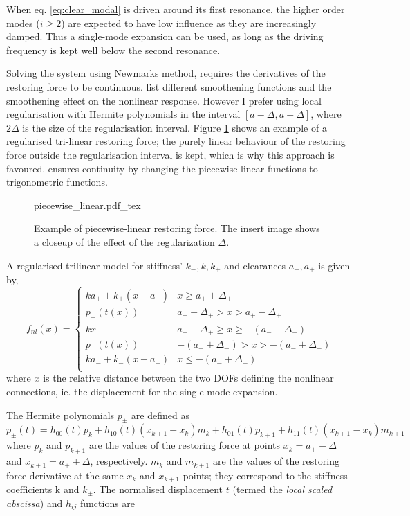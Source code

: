 When eq. \eqref{eq:clear_modal} is driven around its first resonance, the higher
order modes ($i\geq 2$) are expected to have low influence as they are
increasingly damped. Thus a single-mode expansion can be used, as long as the
driving frequency is kept well below the second resonance.

Solving the system using Newmarks method, requires the derivatives of the
restoring force to be continuous. \autocite{kim2003a} list different smoothening
functions and the smoothening effect on the nonlinear response.
However I prefer using local regularisation with Hermite polynomials in the
interval $[a-\Delta, a+\Delta]$, where $2\Delta$ is the size of the
regularisation interval. Figure \ref{fig:fnl_piecewise} shows an example of a
regularised tri-linear restoring force; the purely linear behaviour of the
restoring force outside the regularisation interval is kept, which is why this
approach is favoured. \autocite{kim2003a} ensures continuity by changing the
piecewise linear functions to trigonometric functions.

\begin{figure}[!ht]
  \centering
  \def\svgwidth{10cm}
  {piecewise_linear.pdf_tex}
  \caption{Example of piecewise-linear restoring force. The insert image shows a
    closeup of the effect of the regularization $\Delta$.}
  \label{fig:fnl_piecewise}
\end{figure}


A regularised trilinear model for stiffness' $k_-, k, k_+$ and clearances $a_-,
a_+$ is given by, %
\begin{equation}
  \label{eq:fnl_piecewise}
  f_{nl}(x) =
  \begin{cases}
    ka_+ + k_+(x-a_+) & x \geq a_+ + \Delta_+ \\
    p_+(t(x)) & a_+ + \Delta_+ > x > a_+ - \Delta_+ \\
    kx & a_+ - \Delta_+ \geq x \geq  -(a_- - \Delta_-) \\
    p_-(t(x)) & -(a_- + \Delta_-) > x > -(a_- + \Delta_-) \\
    ka_- + k_-(x-a_-) & x \leq -(a_- + \Delta_-) \\
  \end{cases}
\end{equation}
where $x$ is the relative distance between the two DOFs defining the nonlinear
connections, ie. the displacement for the single mode expansion.

The Hermite polynomials $p_\pm$ are defined as
\begin{equation}
  \label{eq:fnl_herm_pol}
  p_\pm(t) = h_{00}(t)p_k + h_{10}(t)(x_{k+1}-x_k)m_k + h_{01}(t)p_{k+1} + h_{11}(t)(x_{k+1} - x_k)m_{k+1}
\end{equation}
where $p_k$ and $p_{k+1}$ are the values of the restoring force at points $x_k =
a_\pm - \Delta$ and $x_{k+1} = a_\pm + \Delta$, respectively. $m_k$
and $m_{k+1}$ are the values of the restoring force derivative at the same $x_k$
and $x_{k+1}$ points; they correspond to the stiffness coefficients k and
$k_\pm$. The normalised displacement $t$ (termed the \textit{local scaled
  abscissa}) and $h_{ij}$ functions are

